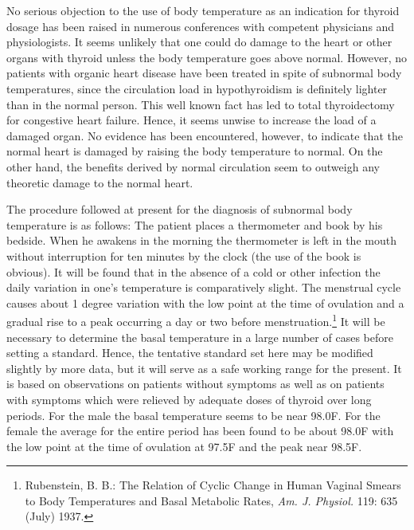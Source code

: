 \documentclass[10pt, letterpaper]{memoir}
\begin{document}
\begin{multicols}{2}
No serious objection to the use of body temperature as an indication for thyroid dosage has been raised in numerous conferences with competent physicians and physiologists. It seems unlikely that one could do damage to the heart or other organs with thyroid unless the body temperature goes above normal. However, no patients with organic heart disease have been treated in spite of subnormal body temperatures, since the circulation load in hypothyroidism is definitely lighter than in the normal person. This well known fact has led to total thyroidectomy for congestive heart failure. Hence, it seems unwise to increase the load of a damaged organ. No evidence has been encountered, however, to indicate that the normal heart is damaged by raising the body temperature to normal. On the other hand, the benefits derived by normal circulation seem to outweigh any theoretic damage to the normal heart.

The procedure followed at present for the diagnosis of subnormal body temperature is as follows: The patient places a thermometer and book by his bedside. When he awakens in the morning the thermometer is left in the mouth without interruption for ten minutes by the clock (the use of the book is obvious). It will be found that in the absence of a cold or other infection the daily variation in one's temperature is comparatively slight. The menstrual cycle causes about 1 degree variation with the low point at the time of ovulation and a gradual rise to a peak occurring a day or two before menstruation.\footnote{Rubenstein, B. B.: The Relation of Cyclic Change in Human Vaginal Smears to Body Temperatures and Basal Metabolic Rates, \textit{Am. J. Physiol.} 119: 635 (July) 1937.} It will be necessary to determine the basal temperature in a large number of cases before setting a standard. Hence, the tentative standard set here may be modified slightly by more data, but it will serve as a safe working range for the present. It is based on observations on patients without symptoms as well as on patients with symptoms which were relieved by adequate doses of thyroid over long periods. For the male the basal temperature seems to be near 98.0\textdegree{}F. For the female the average for the entire period has been found to be about 98.0\textdegree{}F with the low point at the time of ovulation at 97.5\textdegree{}F and the peak near 98.5\textdegree{}F.


\end{multicols}
\end{document}
